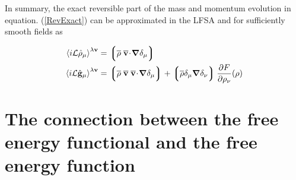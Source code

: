 \documentclass[b5paper,openright,10pt]{book}
\newcommand{\esc}{\!\cdot\!}
\newcommand{\llangle}{\left\langle}
\newcommand{\rrangle}{\right\rangle}
\newcommand{\llg}{\left\lgroup}
\newcommand{\rlg}{\right\rgroup}
\begin{document}
\begin{appendices}
In  summary,  the exact  reversible  part  of  the mass  and  momentum
evolution in equation. (\ref{RevExact}) can be approximated in the LFSA and
for sufficiently smooth fields as

\begin{align}
  \llangle i{\cal L}\hat{\rho}_\mu\rrangle^{\lambda{\bf v}} &=
\llg \overline{\rho}\;\overline{\bf v}\esc\boldsymbol{\nabla}\delta_{\mu}\rlg
\nonumber\\
  \llangle i{\cal L}\hat{\bf g}_\mu\rrangle^{\lambda{\bf v}} &=
\llg\overline{\rho}\;
\overline{\bf v}\;\overline{\bf v}\esc\boldsymbol{\nabla}\delta_{\mu}\rlg
+\llg\overline{\rho}\delta_{\mu}\boldsymbol{\nabla}\delta_{\nu}\rlg
\frac{\partial  F}{\partial \rho_{\nu}}(\rho)
\label{RevApprox}
\end{align}

\section{The connection between the  free energy functional and the
  free energy function}
\label{Ap:free}


\end{appendices}
\end{document}
